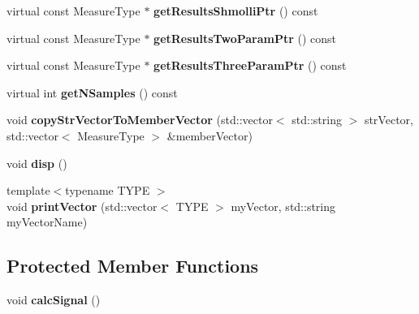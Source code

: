 \begin{DoxyCompactItemize}
\item 
\hypertarget{class_ox_1_1_test_data_ad822f6946548df6c68cf6cb007030702}{virtual const Measure\-Type $\ast$ {\bfseries get\-Results\-Shmolli\-Ptr} () const }\label{class_ox_1_1_test_data_ad822f6946548df6c68cf6cb007030702}

\item 
\hypertarget{class_ox_1_1_test_data_a941d1027bc1ee142c5cf8ef1dbbefa7e}{virtual const Measure\-Type $\ast$ {\bfseries get\-Results\-Two\-Param\-Ptr} () const }\label{class_ox_1_1_test_data_a941d1027bc1ee142c5cf8ef1dbbefa7e}

\item 
\hypertarget{class_ox_1_1_test_data_a6670e22176b7a599e2ff0e193a271d83}{virtual const Measure\-Type $\ast$ {\bfseries get\-Results\-Three\-Param\-Ptr} () const }\label{class_ox_1_1_test_data_a6670e22176b7a599e2ff0e193a271d83}

\item 
\hypertarget{class_ox_1_1_test_data_a93fc01cb722f3cadbaa530068c0079da}{virtual int {\bfseries get\-N\-Samples} () const }\label{class_ox_1_1_test_data_a93fc01cb722f3cadbaa530068c0079da}

\item 
\hypertarget{class_ox_1_1_test_data_a4c5bb0b0296218d61c608a8592900c39}{void {\bfseries copy\-Str\-Vector\-To\-Member\-Vector} (std\-::vector$<$ std\-::string $>$ str\-Vector, std\-::vector$<$ Measure\-Type $>$ \&member\-Vector)}\label{class_ox_1_1_test_data_a4c5bb0b0296218d61c608a8592900c39}

\item 
\hypertarget{class_ox_1_1_test_data_ac19364ea614dad392eefb4dbeb8a7903}{void {\bfseries disp} ()}\label{class_ox_1_1_test_data_ac19364ea614dad392eefb4dbeb8a7903}

\item 
\hypertarget{class_ox_1_1_test_data_a3de0e44dba2bd5e3b7556d662575378a}{{\footnotesize template$<$typename T\-Y\-P\-E $>$ }\\void {\bfseries print\-Vector} (std\-::vector$<$ T\-Y\-P\-E $>$ my\-Vector, std\-::string my\-Vector\-Name)}\label{class_ox_1_1_test_data_a3de0e44dba2bd5e3b7556d662575378a}

\end{DoxyCompactItemize}
\subsection*{Protected Member Functions}
\begin{DoxyCompactItemize}
\item 
\hypertarget{class_ox_1_1_test_data_a014e56191a98df90450c0b6fa2abc45d}{void {\bfseries calc\-Signal} ()}\label{class_ox_1_1_test_data_a014e56191a98df90450c0b6fa2abc45d}

\end{DoxyCompactItemize}
